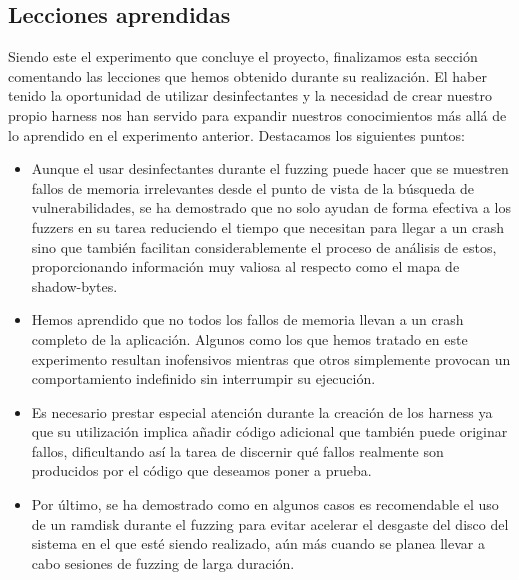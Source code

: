 \subsection{Lecciones aprendidas}
Siendo este el experimento que concluye el proyecto, finalizamos esta sección comentando las lecciones que hemos obtenido durante su realización. El haber
tenido la oportunidad de utilizar desinfectantes y la necesidad de crear nuestro propio harness nos han servido para expandir nuestros conocimientos más allá
de lo aprendido en el experimento anterior. Destacamos los siguientes puntos:
\begin{itemize}
    \item Aunque el usar desinfectantes durante el fuzzing puede hacer que se muestren fallos de memoria irrelevantes desde el punto de vista de la búsqueda 
    de vulnerabilidades, se ha demostrado que no solo ayudan de forma efectiva a los fuzzers en su tarea reduciendo el tiempo que necesitan para llegar a un 
    crash sino que también facilitan considerablemente el proceso de análisis de estos, proporcionando información muy valiosa al respecto como el mapa de 
    shadow-bytes.
    \item Hemos aprendido que no todos los fallos de memoria llevan a un crash completo de la aplicación. Algunos como los que hemos tratado en este experimento
    resultan inofensivos mientras que otros simplemente provocan un comportamiento indefinido sin interrumpir su ejecución.
    \item Es necesario prestar especial atención durante la creación de los harness ya que su utilización implica añadir código adicional que también puede
    originar fallos, dificultando así la tarea de discernir qué fallos realmente son producidos por el código que deseamos poner a prueba.
    \item Por último, se ha demostrado como en algunos casos es recomendable el uso de un ramdisk durante el fuzzing para evitar acelerar el desgaste del
    disco del sistema en el que esté siendo realizado, aún más cuando se planea llevar a cabo sesiones de fuzzing de larga duración.
\end{itemize}